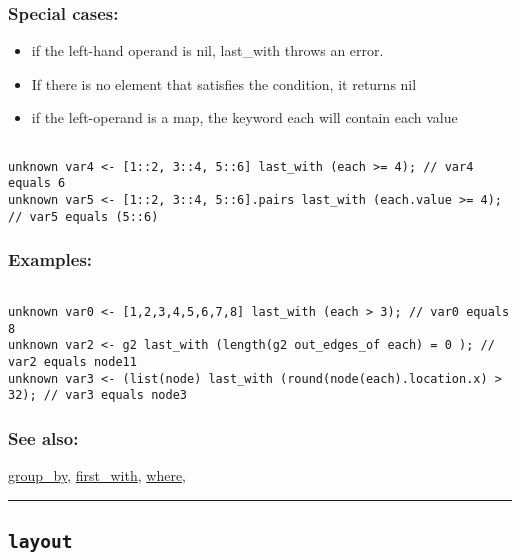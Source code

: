 \documentclass[]{book}
\providecommand{\tightlist}{%
  \setlength{\itemsep}{0pt}\setlength{\parskip}{0pt}}
\theoremstyle{definition}
\theoremstyle{definition}
\theoremstyle{definition}
\theoremstyle{remark}
\begin{document}
\subsubsection{Special cases:}\label{special-cases-86}

\begin{itemize}
\tightlist
\item
  if the left-hand operand is nil, last\_with throws an error.\\
\item
  If there is no element that satisfies the condition, it returns nil\\
\item
  if the left-operand is a map, the keyword each will contain each value
\end{itemize}

\begin{verbatim}
 
unknown var4 <- [1::2, 3::4, 5::6] last_with (each >= 4); // var4 equals 6 
unknown var5 <- [1::2, 3::4, 5::6].pairs last_with (each.value >= 4); // var5 equals (5::6)
\end{verbatim}

\subsubsection{Examples:}\label{examples-222}

\begin{verbatim}
 
unknown var0 <- [1,2,3,4,5,6,7,8] last_with (each > 3); // var0 equals 8 
unknown var2 <- g2 last_with (length(g2 out_edges_of each) = 0 ); // var2 equals node11 
unknown var3 <- (list(node) last_with (round(node(each).location.x) > 32); // var3 equals node3
\end{verbatim}

\subsubsection{See also:}\label{see-also-124}

\href{OperatorsDH\#group_by}{group\_by},
\href{OperatorsDH\#first_with}{first\_with},
\href{OperatorsSZ\#where}{where},

\begin{center}\rule{0.5\linewidth}{\linethickness}\end{center}

\subsection{\texorpdfstring{\texttt{layout}}{layout}}\label{layout}
\end{document}
